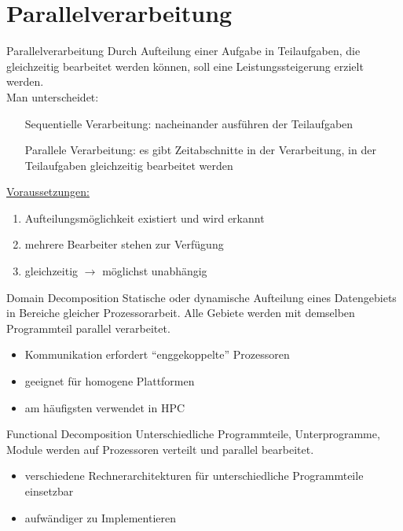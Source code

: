 \section{Parallelverarbeitung}\label{sec:parallelverarbeitung}

\begin{defi}{Parallelverarbeitung}
    Durch Aufteilung einer Aufgabe in Teilaufgaben,
    die gleichzeitig bearbeitet werden können,
    soll eine Leistungssteigerung erzielt werden.\\
    Man unterscheidet:
    \begin{itemize}
        \item[Sequentielle Verarbeitung:] nacheinander ausführen der Teilaufgaben
        \item[Parallele Verarbeitung:] es gibt Zeitabschnitte in der Verarbeitung, in der Teilaufgaben gleichzeitig bearbeitet werden
    \end{itemize}
    \underline{Voraussetzungen:}
    \begin{enumerate}
        \item Aufteilungsmöglichkeit existiert und wird erkannt
        \item mehrere Bearbeiter stehen zur Verfügung
        \item gleichzeitig $\to$ möglichst unabhängig
    \end{enumerate}
\end{defi}

\begin{defi}[Parallelverarbeitung]{Domain Decomposition}
    Statische oder dynamische Aufteilung eines Datengebiets in Bereiche gleicher Prozessorarbeit.
    Alle Gebiete werden mit demselben Programmteil parallel verarbeitet.
    \begin{itemize}[$\to$]
        \item Kommunikation erfordert \enquote{enggekoppelte} Prozessoren
        \item geeignet für homogene Plattformen
        \item am häufigsten verwendet in HPC
    \end{itemize}
\end{defi}

\begin{defi}[Parallelverarbeitung]{Functional Decomposition}
    Unterschiedliche Programmteile, Unterprogramme,
    Module werden auf Prozessoren verteilt und parallel bearbeitet.
    \begin{itemize}[$\to$]
        \item verschiedene Rechnerarchitekturen für unterschiedliche Programmteile einsetzbar
        \item aufwändiger zu Implementieren
    \end{itemize}
\end{defi}

